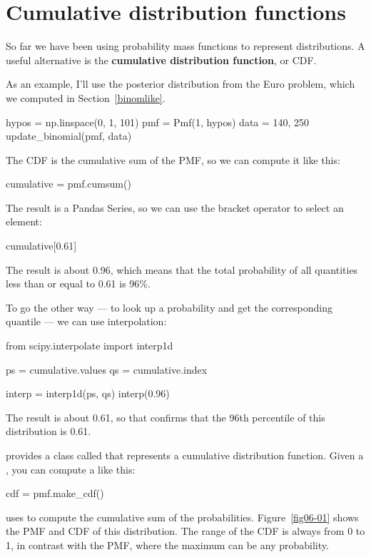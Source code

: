 \documentclass[12pt]{book}
\theoremstyle{exercise}
\begin{document}
\section{Cumulative distribution functions}

So far we have been using probability mass functions to represent distributions.
A useful alternative is the {\bf cumulative distribution function}, or CDF.

As an example, I'll use the posterior distribution from the Euro problem, which we computed in Section~\ref{binomlike}.

\begin{code}
hypos = np.linspace(0, 1, 101)
pmf = Pmf(1, hypos)
data = 140, 250
update_binomial(pmf, data)
\end{code}

The CDF is the cumulative sum of the PMF, so we can compute it like this:

\begin{code}
cumulative = pmf.cumsum()
\end{code}

The result is a Pandas Series, so we can use the bracket operator to select an element:

\begin{code}
cumulative[0.61]
\end{code}

The result is about 0.96, which means that the total probability of all quantities less than or equal to 0.61 is 96\%.

To go the other way --- to look up a probability and get the corresponding quantile --- we can use interpolation:

\begin{code}
from scipy.interpolate import interp1d

ps = cumulative.values
qs = cumulative.index

interp = interp1d(ps, qs)
interp(0.96)
\end{code}

The result is about 0.61, so that confirms that the 96th percentile of this distribution is 0.61.

 provides a class called  that represents a cumulative distribution function.
Given a , you can compute a  like this:

\begin{code}
cdf = pmf.make_cdf()
\end{code}

 uses  to compute the cumulative sum of the probabilities.
Figure~\ref{fig06-01} shows the PMF and CDF of this distribution.
The range of the CDF is always from 0 to 1, in contrast with the PMF, where the maximum can be any probability.
\end{document}
